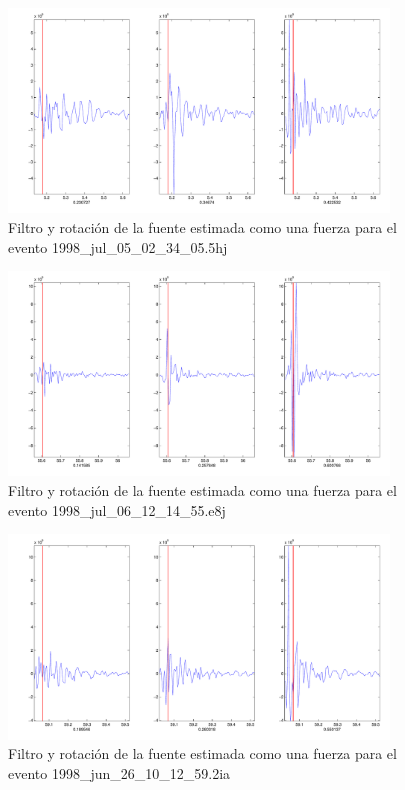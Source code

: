\begin{figure}[H]
\includegraphics[width=0.9\textwidth,height=0.4\textheight]{linea_timerev/figuras/plotSrcEv7filtrotsrc.pdf}
\caption{Filtro y rotación de la fuente estimada como una fuerza para el
evento 1998\_jul\_05\_02\_34\_05.5hj}
\end{figure}
\begin{figure}[H]
\includegraphics[width=0.9\textwidth,height=0.4\textheight]{linea_timerev/figuras/plotSrcEv8filtrotsrc.pdf}
\caption{Filtro y rotación de la fuente estimada como una fuerza para el
evento 1998\_jul\_06\_12\_14\_55.e8j}
\end{figure}
\begin{figure}[H]
\includegraphics[width=0.9\textwidth,height=0.4\textheight]{linea_timerev/figuras/plotSrcEv9filtrotsrc.pdf}
\caption{Filtro y rotación de la fuente estimada como una fuerza para el
evento 1998\_jun\_26\_10\_12\_59.2ia}
\end{figure}
